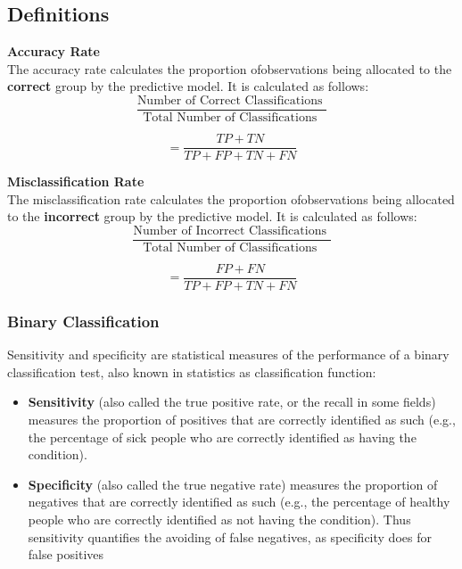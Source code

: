 \documentclass[a4]{beamer}
\begin{document}
\subsection*{Definitions}
\begin{frame}
	\textbf{Accuracy Rate}\\
	The accuracy rate calculates the proportion ofobservations being allocated to the \textbf{correct} group by the predictive model. It is calculated as follows:
	\[ \frac{
		\mbox{Number of Correct Classifications }}{\mbox{Total Number of Classifications }} \]
	
	\[ = \frac{TP + TN}{TP+FP+TN+FN}\]
	
\end{frame}
\begin{frame}
	\noindent \textbf{Misclassification Rate}\\
	The misclassification rate calculates the proportion ofobservations being allocated to the \textbf{incorrect} group by the predictive model. It is calculated as follows:
	\[ \frac{
		\mbox{Number of Incorrect Classifications }}{\mbox{Total Number of Classifications }} \]
	
	\[ = \frac{FP + FN}{TP+FP+TN+FN}\]
\end{frame}
\begin{frame}	\frametitle{Binary Classification}
	\large
Sensitivity and specificity are statistical measures of the performance of a binary classification test, also known in statistics as classification function:

\begin{itemize}
\item \textbf{Sensitivity} (also called the true positive rate, or the recall in some fields) measures the proportion of positives that are correctly identified as such (e.g., the percentage of sick people who are correctly identified as having the condition).
\item \textbf{Specificity} (also called the true negative rate) measures the proportion of negatives that are correctly identified as such (e.g., the percentage of healthy people who are correctly identified as not having the condition).
Thus sensitivity quantifies the avoiding of false negatives, as specificity does for false positives
\end{itemize}
\end{frame}
\end{document}
